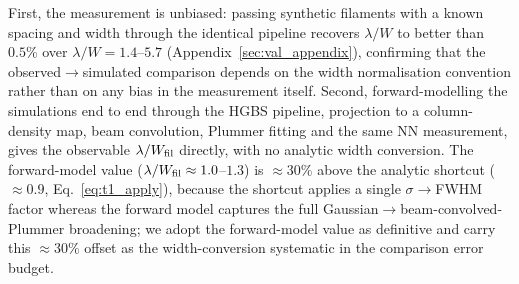 \documentclass[usenatbib,twoside,twocolumn]{mnras}
\begin{document}
First, the measurement is unbiased: passing synthetic filaments with a known spacing and width through the identical pipeline recovers $\lambda/W$ to better than $0.5\%$ over $\lambda/W=1.4$--$5.7$ (Appendix~\ref{sec:val_appendix}), confirming that the observed$\to$simulated comparison depends on the width normalisation convention rather than on any bias in the measurement itself. Second, forward-modelling the simulations end to end through the HGBS pipeline, projection to a column-density map, beam convolution, Plummer fitting and the same NN measurement, gives the observable $\lambda/W_{\rm fil}$ directly, with no analytic width conversion. The forward-model value ($\lambda/W_{\rm fil}\approx1.0$--$1.3$) is $\approx30\%$ above the analytic shortcut ($\approx0.9$, Eq.~\ref{eq:t1_apply}), because the shortcut applies a single $\sigma\!\to\!$FWHM factor whereas the forward model captures the full Gaussian$\to$beam-convolved-Plummer broadening; we adopt the forward-model value as definitive and carry this $\approx30\%$ offset as the width-conversion systematic in the comparison error budget.
\end{document}
